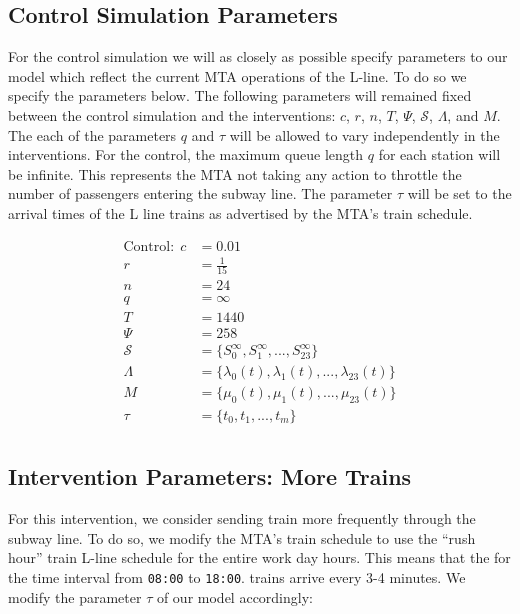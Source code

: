 \documentclass[12pt]{article}
\begin{document}
\subsection{Control Simulation Parameters}

For the control simulation we will as closely as possible specify parameters to our model which reflect the current MTA operations of the L-line.
To do so we specify the parameters below.
The following parameters will remained fixed between the control simulation and the interventions: $c$, $r$, $n$, $T$, $\Psi$, $\mathcal{S}$, $\Lambda$, and $M$.
The each of the parameters $q$ and $\tau$ will be allowed to vary independently in the interventions.
For the control, the maximum queue length $q$ for each station will be infinite.
This represents the MTA not taking any action to throttle the number of passengers entering the subway line.
The parameter $\tau$ will be set to the arrival times of the L line trains as advertised by the MTA's train schedule.

\begin{equation*}
\begin{split}
\text{Control}: \; c &= 0.01 \\
  r &= \frac{1}{15} \\
  n &= 24 \\
  q &= \infty \\
  T &= 1440 \\
  \Psi &= 258 \\
  \mathcal{S} &= \{ S_0^\infty, S_1^\infty, ... , S_{23}^\infty \} \\
  \Lambda &= \{ \lambda_0(t), \lambda_1(t), ... , \lambda_{23}(t) \} \\
  M &= \{ \mu_0(t), \mu_1(t), ... , \mu_{23}(t) \} \\
  \tau &= \{ t_0, t_1, ..., t_m \} \\
\end{split}
\end{equation*}


\subsection{Intervention Parameters: More Trains}

For this intervention, we consider sending train more frequently through the subway line. To do so, we modify the MTA's train schedule to use the ``rush hour'' train L-line schedule for the entire work day hours. This means that the for the time interval from \texttt{08:00} to \texttt{18:00}. trains arrive every 3-4 minutes. We modify the parameter $\tau$ of our model accordingly:
\end{document}
